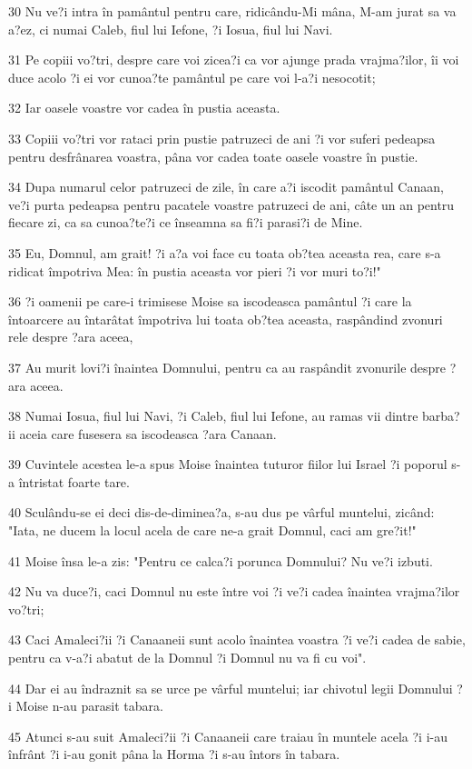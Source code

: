 \par 30 Nu ve?i intra în pamântul pentru care, ridicându-Mi mâna, M-am jurat sa va a?ez, ci numai Caleb, fiul lui Iefone, ?i Iosua, fiul lui Navi.
\par 31 Pe copiii vo?tri, despre care voi zicea?i ca vor ajunge prada vrajma?ilor, îi voi duce acolo ?i ei vor cunoa?te pamântul pe care voi l-a?i nesocotit;
\par 32 Iar oasele voastre vor cadea în pustia aceasta.
\par 33 Copiii vo?tri vor rataci prin pustie patruzeci de ani ?i vor suferi pedeapsa pentru desfrânarea voastra, pâna vor cadea toate oasele voastre în pustie.
\par 34 Dupa numarul celor patruzeci de zile, în care a?i iscodit pamântul Canaan, ve?i purta pedeapsa pentru pacatele voastre patruzeci de ani, câte un an pentru fiecare zi, ca sa cunoa?te?i ce înseamna sa fi?i parasi?i de Mine.
\par 35 Eu, Domnul, am grait! ?i a?a voi face cu toata ob?tea aceasta rea, care s-a ridicat împotriva Mea: în pustia aceasta vor pieri ?i vor muri to?i!"
\par 36 ?i oamenii pe care-i trimisese Moise sa iscodeasca pamântul ?i care la întoarcere au întarâtat împotriva lui toata ob?tea aceasta, raspândind zvonuri rele despre ?ara aceea,
\par 37 Au murit lovi?i înaintea Domnului, pentru ca au raspândit zvonurile despre ?ara aceea.
\par 38 Numai Iosua, fiul lui Navi, ?i Caleb, fiul lui Iefone, au ramas vii dintre barba?ii aceia care fusesera sa iscodeasca ?ara Canaan.
\par 39 Cuvintele acestea le-a spus Moise înaintea tuturor fiilor lui Israel ?i poporul s-a întristat foarte tare.
\par 40 Sculându-se ei deci dis-de-diminea?a, s-au dus pe vârful muntelui, zicând: "Iata, ne ducem la locul acela de care ne-a grait Domnul, caci am gre?it!"
\par 41 Moise însa le-a zis: "Pentru ce calca?i porunca Domnului? Nu ve?i izbuti.
\par 42 Nu va duce?i, caci Domnul nu este între voi ?i ve?i cadea înaintea vrajma?ilor vo?tri;
\par 43 Caci Amaleci?ii ?i Canaaneii sunt acolo înaintea voastra ?i ve?i cadea de sabie, pentru ca v-a?i abatut de la Domnul ?i Domnul nu va fi cu voi".
\par 44 Dar ei au îndraznit sa se urce pe vârful muntelui; iar chivotul legii Domnului ?i Moise n-au parasit tabara.
\par 45 Atunci s-au suit Amaleci?ii ?i Canaaneii care traiau în muntele acela ?i i-au înfrânt ?i i-au gonit pâna la Horma ?i s-au întors în tabara.

